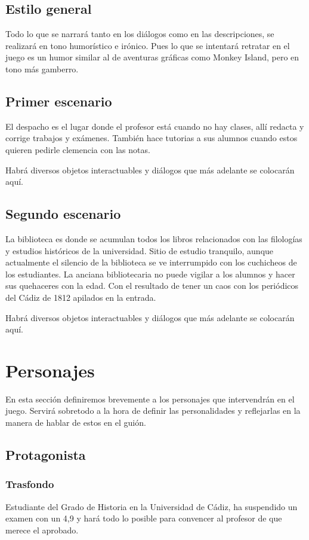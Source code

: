         \subsection{Estilo general}%
        Todo lo que se narrará tanto en los diálogos como en las descripciones, se realizará en tono humorístico e irónico. Pues lo que se intentará retratar en el juego es un humor similar al de aventuras gráficas como Monkey Island, pero en tono más gamberro. 
        
        \subsection{Primer escenario}
        El despacho es el lugar donde el profesor está cuando no hay clases, allí redacta y corrige trabajos y exámenes. También hace tutorias a sus alumnos cuando estos quieren pedirle clemencia con las notas. 
        
        Habrá diversos objetos interactuables y diálogos que más adelante se colocarán aquí.
        \subsection{Segundo escenario}
        La biblioteca es donde se acumulan todos los libros relacionados con las filologías y estudios históricos de la universidad. Sitio de estudio tranquilo, aunque actualmente el silencio de la biblioteca se ve interrumpido con los cuchicheos de los estudiantes. La anciana bibliotecaria no puede vigilar a los alumnos y hacer sus quehaceres con la edad. Con el resultado de tener un caos con los periódicos del Cádiz de 1812 apilados en la entrada.
        
        Habrá diversos objetos interactuables y diálogos que más adelante se colocarán aquí.
        
    \section{Personajes}
    En esta sección definiremos brevemente a los personajes que intervendrán en el juego. Servirá sobretodo a la hora de definir las personalidades y reflejarlas en la manera de hablar de estos en el guión.
    
        \subsection{Protagonista}
            \subsubsection{Trasfondo}
            Estudiante del Grado de Historia en la Universidad de Cádiz, ha suspendido un examen con un 4,9 y hará todo lo posible para convencer al profesor de que merece el aprobado.
